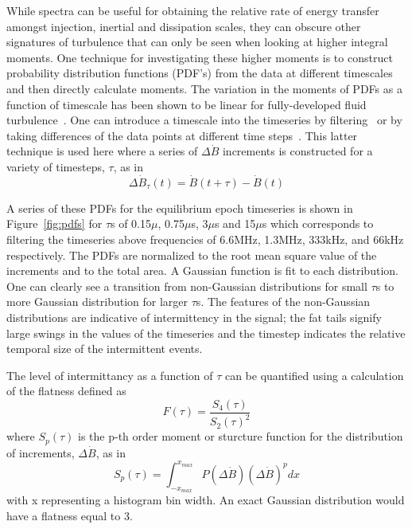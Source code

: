 \documentclass[12pt]{iopart}
\begin{document}
While spectra can be useful for obtaining the relative rate of energy transfer amongst injection, inertial and dissipation scales, they can obscure other signatures of turbulence that can only be seen when looking at higher integral moments. One technique for investigating these higher moments is to construct probability distribution functions (PDF's) from the data at different timescales and then directly calculate moments. The variation in the moments of PDFs as a function of timescale has been shown to be linear for fully-developed fluid turbulence~\cite{frisch95}. One can introduce a timescale into the timeseries by filtering~\cite{frisch95,wan12_apj} or by taking differences of the data points at different time steps~\cite{Greco08,Greco09}. This latter technique is used here where a series of $\Delta \dot{B}$ increments is constructed for a variety of timesteps, $\tau$, as in
\begin{equation}
\Delta \dot{B}_{\tau}(t) = \dot{B}(t+\tau)-\dot{B}(t)
\label{eq:increments}
\end{equation}

A series of these PDFs for the equilibrium epoch timeseries is shown in Figure~\ref{fig:pdfs} for $\tau$s of 0.15$\mu$, 0.75$\mu$s, 3$\mu$s and 15$\mu$s which corresponds to filtering the timeseries above frequencies of 6.6MHz, 1.3MHz, 333kHz, and 66kHz respectively. The PDFs are normalized to the root mean square value of the increments and to the total area. A Gaussian function is fit to each distribution. One can clearly see a transition from non-Gaussian distributions for small $\tau$s to more Gaussian distribution for larger $\tau$s. The features of the non-Gaussian distributions are indicative of intermittency in the signal; the fat tails signify large swings in the values of the timeseries and the timestep indicates the relative temporal size of the intermittent events.

The level of intermittancy as a function of $\tau$ can be quantified using a calculation of the flatness defined as~\cite{deWit13}
\begin{equation}
F(\tau) = \frac{S_{4}(\tau)}{S_{2}(\tau)^{2}}
\label{eq:flatness}
\end{equation}
where $S_{p}(\tau)$ is the p-th order moment or sturcture function for the distribution of increments, $\Delta \dot{B}$, as in
\begin{equation}
S_{p}(\tau) = \int_{-x_{max}}^{x_{max}} P(\Delta \dot{B})(\Delta \dot{B})^{p} dx
\label{eq:structurefunc}
\end{equation}
with x representing a histogram bin width. An exact Gaussian distribution would have a flatness equal to 3.
\end{document}
